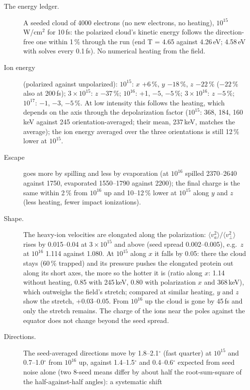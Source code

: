 \begin{description}
  \item[The energy ledger.] A seeded cloud of 4000 electrons (no new electrons, no heating), $10^{15}$\,W/cm$^2$ for
    10\,fs: the polarized cloud's kinetic energy follows the direction-free one within 1\,\% through the run (end
    T = 4.65 against 4.26\,eV; 4.58\,eV with solves every 0.1\,fs). No numerical heating from the field.
  \item[Ion energy] (polarized against unpolarized):
    $10^{15}$: $x$ +6\,\%, $y$ $-18$\,\%, $z$ $-22$\,\% ($-22$\,\% also at 200\,fs);
    $3\times10^{15}$: $z$ $-37$\,\%; $10^{16}$: +1, $-5$, $-5$\,\%; $3\times10^{16}$: $z$ $-5$\,\%;
    $10^{17}$: $-1$, $-3$, $-5$\,\%. At low intensity this follows the heating, which depends on the axis through the
    depolarization factor ($10^{15}$: 368, 184, 160\,keV against 245 orientation-averaged; their mean, 237\,keV,
    matches the average); the ion energy averaged over the three orientations is still 12\,\% lower at $10^{15}$.
  \item[Escape] goes more by spilling and less by evaporation (at $10^{16}$ spilled 2370--2640 against 1750,
    evaporated 1550--1790 against 2200); the final charge is the same within 2\,\% from $10^{16}$ up and 10--12\,\%
    lower at $10^{15}$ along $y$ and $z$ (less heating, fewer impact ionizations).
  \item[Shape.] The heavy-ion velocities are elongated along the polarization: $\langle v_a^2\rangle/\langle
    v_\perp^2\rangle$ rises by 0.015--0.04 at $3\times10^{15}$ and above (seed spread 0.002--0.005), e.g.\ $z$ at
    $10^{16}$ 1.114 against 1.080. At $10^{15}$ along $x$ it falls by 0.05: there the cloud stays (60\,\% trapped)
    and its pressure pushes the elongated protein out along its short axes, the more so the hotter it is (ratio along
    $x$: 1.14 without heating, 0.85 with 245\,keV, 0.80 with polarization $x$ and 368\,keV), which outweighs the
    field's stretch; compared at similar heating, $y$ and $z$ show the stretch, +0.03--0.05. From $10^{16}$ up the
    cloud is gone by 45\,fs and only the stretch remains. The charge of the ions near the poles against the equator
    does not change beyond the seed spread.
  \item[Directions.] The seed-averaged directions move by 1.8--2.1$^\circ$ (fast quarter) at $10^{15}$ and
    0.7--1.0$^\circ$ from $10^{16}$ up, against 1.4--1.5$^\circ$ and 0.4--0.6$^\circ$ expected from seed noise alone
    (two 8-seed means differ by about half the root-sum-square of the half-against-half angles): a systematic shift

\end{description}
